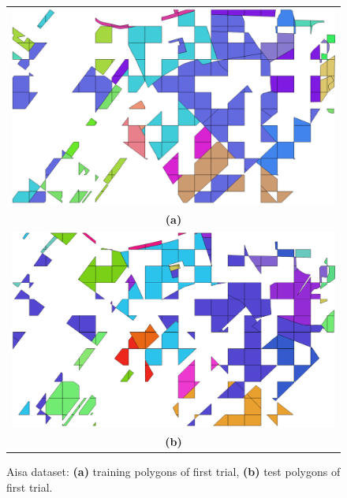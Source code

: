 \documentclass[journal,10pt]{IEEEtran}
\begin{document}
    \begin{figure}[!t]
        \centering
        \begin{tabular}{c}
            \includegraphics[width=0.7\columnwidth]{Fig/aisa_gt_train.png} \\
            {\bfseries{(a)}} \\
            \includegraphics[width=0.7\columnwidth]{Fig/aisa_gt_test.png} \\
            {\bfseries{(b)}} \\
        \end{tabular}
        \caption{Aisa dataset: {\bfseries{(a)}} training polygons of first trial, {\bfseries{(b)}} test polygons of first trial.\label{fig:set-aisa}}
    \end{figure}
\end{document}
